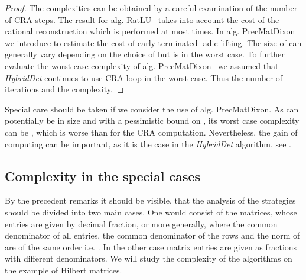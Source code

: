 \documentclass{acm_proc_article-sp}   \usepackage{graphicx,url}
\newcommand{\algrdRat}{RatLU}
\newcommand{\algrdDixon}{PrecMatDixon}
\begin{document}
\begin{proof}

The complexities can be obtained by a careful examination of the number of CRA
steps.
The result for alg. \algrdRat~ takes into account the cost of the rational reconstruction which is
performed at most  times. In alg. \algrdDixon~ we
introduce  to estimate the cost of early terminated -adic
lifting. The size of  can generally vary depending on the choice of  but
is  in the worst case. To further
evaluate the worst case complexity of alg. \algrdDixon~ we assumed
that {\em HybridDet} continues to use CRA loop in the worst case. Thus
the number of iterations  and the complexity.
\end{proof}

Special care should be taken if we consider the use of alg. \algrdDixon.
As  can potentially be  in size and with a
pessimistic bound on , its worst case complexity can be , which is worse than for the CRA computation. Nevertheless, the gain of computing   can be important, as it is the case in the {\em HybridDet} algorithm, see \cite{jgd:2006:det}.

\subsection{Complexity in the special cases}\label{sec:spc}
By the precedent remarks it should be visible, that the analysis of the strategies should be divided into two main cases. One would consist of the matrices, whose entries are given by decimal fraction, or more generally, where the common denominator of all entries, the common denominator of the rows and the norm of  are of the same order i.e. . In the other case matrix entries are given as fractions with different denominators. We will study the complexity of the algorithms on the example of Hilbert matrices.
\end{document}
